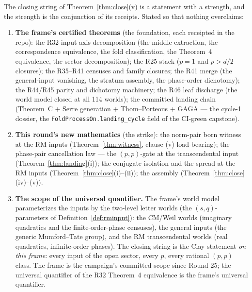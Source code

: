\documentclass[11pt]{article}
\theoremstyle{definition}
\begin{document}
The closing string of Theorem~\ref{thm:close}(v) is a statement with a
strength, and the strength is the conjunction of its receipts. Stated so
that nothing overclaims:

\begin{enumerate}[label=(\alph*)]
\item \textbf{The frame's certified theorems} (the foundation, each
receipted in the repo): the R32 input-axis decomposition (the middle
extraction, the correspondence equivalence, the fold classification,
the Theorem~4 equivalence, the sector decomposition); the R25 stack
($p=1$ and $p>d/2$ closures); the R35--R41 censuses and family
closures; the R41 merge (the general-input vanishing, the
stratum assembly, the phase-order dichotomy); the R44/R45 parity and
dichotomy machinery; the R46 leaf discharge (the world model closed at
all 114 worlds); the committed landing chain (Theorem~C $+$ Serre
generation $+$ Thom--Porteous $+$ GAGA --- the cycle-1 dossier, the
\texttt{FoldProcessOn.landing\_cycle} field of the CI-green capstone).
\item \textbf{This round's new mathematics} (the strike): the
norm-pair born witness at the RM inputs (Theorem~\ref{thm:witness},
clause (v) load-bearing); the phase-pair cancellation law --- the
$(p,p)$-gate at the transcendental input
(Theorem~\ref{thm:landing}(i)); the conjugate isolation and the spread
at the RM inputs (Theorem~\ref{thm:close}(i)--(ii)); the assembly
(Theorem~\ref{thm:close}(iv)--(v)).
\item \textbf{The scope of the universal quantifier.} The frame's
world model parameterizes the inputs by the two-level letter worlds
(the $(s,q)$-parameters of Definition~\ref{def:rminput}): the CM/Weil
worlds (imaginary quadratics and the finite-order-phase censuses), the
general inputs (the generic Mumford--Tate group), and the RM
transcendental worlds (real quadratics, infinite-order phases). The
closing string is the Clay statement \emph{on this frame}: every input
of the open sector, every $p$, every rational $(p,p)$ class. The frame
is the campaign's committed scope since Round 25; the universal
quantifier of the R32 Theorem~4 equivalence is the frame's universal
quantifier.
\end{enumerate}
\end{document}
